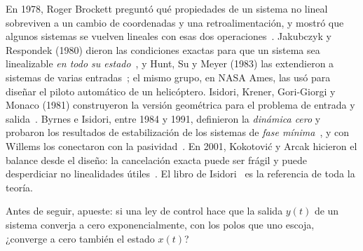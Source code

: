 \begin{historia}
En 1978, Roger Brockett preguntó qué propiedades de un sistema no lineal sobreviven a un cambio de coordenadas y una retroalimentación, y mostró que algunos sistemas se vuelven lineales con esas dos operaciones~\citep{Bro78}. Jakubczyk y Respondek (1980) dieron las condiciones exactas para que un sistema sea linealizable \emph{en todo su estado}~\citep{JaRe80}, y Hunt, Su y Meyer (1983) las extendieron a sistemas de varias entradas~\citep{HSM83}; el mismo grupo, en NASA Ames, las usó para diseñar el piloto automático de un helicóptero. Isidori, Krener, Gori-Giorgi y Monaco (1981) construyeron la versión geométrica para el problema de entrada y salida~\citep{IKGM81}. Byrnes e Isidori, entre 1984 y 1991, definieron la \emph{dinámica cero} y probaron los resultados de estabilización de los sistemas de \emph{fase mínima}~\citep{ByIs88,ByIs91}, y con Willems los conectaron con la pasividad~\citep{BIW91}. En 2001, Kokotović y Arcak hicieron el balance desde el diseño: la cancelación exacta puede ser frágil y puede desperdiciar no linealidades útiles~\citep{KoAr01}. El libro de Isidori~\citep{Isi95} es la referencia de toda la teoría.
\end{historia}

\begin{pausa}
Antes de seguir, apueste: si una ley de control hace que la salida $y(t)$ de un sistema converja a cero exponencialmente, con los polos que uno escoja, ¿converge a cero también el estado $x(t)$?
\end{pausa}
